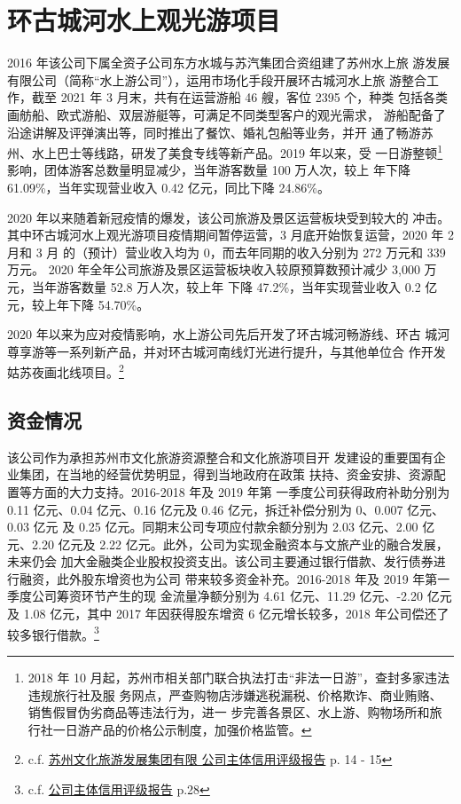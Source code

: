\documentclass[H:\workspace\担保人财务信息2\杭州大运河\HangZhouText.tex]{subfiles}
\begin{document}
\section{环古城河水上观光游项目}
2016 年该公司下属全资子公司东方水城与苏汽集团合资组建了苏州水上旅
游发展有限公司（简称“水上游公司”），运用市场化手段开展环古城河水上旅
游整合工作，截至 2021 年 3 月末，共有在运营游船 46 艘，客位 2395 个，种类
包括各类画舫船、欧式游船、双层游艇等，可满足不同类型客户的观光需求，
游船配备了沿途讲解及评弹演出等，同时推出了餐饮、婚礼包船等业务，并开
通了畅游苏州、水上巴士等线路，研发了美食专线等新产品。2019 年以来，受
一日游整顿\footnote{2018 年 10 月起，苏州市相关部门联合执法打击“非法一日游”，查封多家违法违规旅行社及服
务网点，严查购物店涉嫌逃税漏税、价格欺诈、商业贿赂、销售假冒伪劣商品等违法行为，进一
步完善各景区、水上游、购物场所和旅行社一日游产品的价格公示制度，加强价格监管。}
影响，团体游客总数量明显减少，当年游客数量 100 万人次，较上
年下降 61.09\%，当年实现营业收入 0.42 亿元，同比下降 24.86\%。\par 
    
2020 年以来随着新冠疫情的爆发，该公司旅游及景区运营板块受到较大的
冲击。其中环古城河水上观光游项目疫情期间暂停运营，3 月底开始恢复运营，2020 年 2 月和 3 月
的（预计）营业收入均为 0，而去年同期的收入分别为 272 万元和 339 万元。
2020 年全年公司旅游及景区运营板块收入较原预算数预计减少 3,000 万元，当年游客数量 52.8 万人次，较上年
下降 47.2\%，当年实现营业收入 0.2 亿元，较上年下降 54.70\%。\par 
    
2020 年以来为应对疫情影响，水上游公司先后开发了环古城河畅游线、环古
城河尊享游等一系列新产品，并对环古城河南线灯光进行提升，与其他单位合
作开发姑苏夜画北线项目。\footnote{c.f. 
\href{http://file.finance.sina.com.cn/211.154.219.97:9494/MRGG/BOND/2020/2020-7/2020-07-13/14855437.PDF}{苏州文化旅游发展集团有限
公司主体信用评级报告} p. 14 - 15}
    
\subsection{资金情况}
该公司作为承担苏州市文化旅游资源整合和文化旅游项目开
发建设的重要国有企业集团，在当地的经营优势明显，得到当地政府在政策
扶持、资金安排、资源配置等方面的大力支持。2016-2018 年及 2019 年第
一季度公司获得政府补助分别为 0.11 亿元、0.04 亿元、0.16 亿元及 0.46 亿元，拆迁补偿分别为 0、0.007 亿元、0.03 亿元
及 0.25 亿元。同期末公司专项应付款余额分别为 2.03 亿元、2.00
亿元、2.20 亿元及 2.22 亿元。此外，公司为实现金融资本与文旅产业的融合发展，未来仍会
加大金融类企业股权投资支出。该公司主要通过银行借款、发行债券进行融资，此外股东增资也为公司
带来较多资金补充。2016-2018 年及 2019 年第一季度公司筹资环节产生的现
金流量净额分别为 4.61 亿元、11.29 亿元、-2.20 亿元及 1.08 亿元，其中 2017
年因获得股东增资 6 亿元增长较多，2018 年公司偿还了较多银行借款。\footnote{c.f.
\href{http://file.finance.sina.com.cn/211.154.219.97:9494/MRGG/BOND/2020/2020-7/2020-07-13/14855437.PDF}{公司主体信用评级报告} p.28}
\end{document}
